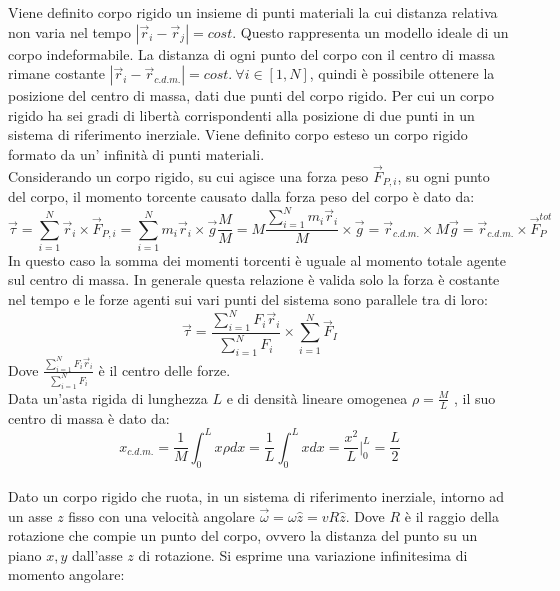 \documentclass{article}
\numberwithin{equation}{subsection}
\begin{document}
Viene definito corpo rigido un insieme di punti materiali la 
cui distanza relativa non varia nel tempo $|\vec{r}_i-\vec{r}_j|=cost.$ Questo rappresenta un modello ideale di un corpo indeformabile. 
La distanza di ogni punto del corpo con il centro di massa 
rimane costante $|\vec{r}_i-\vec{r}_{c.d.m.}|=cost.\:\forall i\in[1,N]$, quindi è possibile ottenere la posizione 
del centro di massa, dati due punti del corpo rigido. Per cui un 
corpo rigido ha sei gradi di libertà corrispondenti alla posizione di due punti in un sistema di riferimento inerziale.  
Viene definito corpo esteso un corpo rigido formato da un'
infinità di punti materiali. 
\\
Considerando un corpo rigido, su cui agisce una forza peso $\vec{F}_{{P,i}}$, 
su ogni punto del corpo, il momento torcente causato dalla forza 
peso del corpo è dato da: 
\begin{equation*}
    \vec{\tau}=\displaystyle\sum_{i=1}^{N}\vec{r}_i\times\vec{F}_{P,i}=
    \displaystyle\sum_{i=1}^{N}m_i\vec{r}_i\times\vec{g}\frac{M}{M}=
    M\displaystyle\frac{\sum_{i=1}^{N}m_i\vec{r}_i}{M}\times\vec{g}=
    \vec{r}_{c.d.m.}\times M\vec{g}=
    \vec{r}_{c.d.m.}\times \vec{F}_P^{tot}
\end{equation*}
In questo caso la somma dei momenti torcenti è uguale al 
momento totale agente sul centro di massa. In generale questa 
relazione è valida solo la forza è costante nel tempo e le 
forze agenti sui vari punti del sistema sono parallele tra di loro: 
\begin{equation}
    \vec{\tau}=\displaystyle\frac{\sum_{i=1}^{N}F_i\vec{r}_i}{\sum_{i=1}^{N}F_i}\times\sum_{i=1}^{N}\vec{F}_I
\end{equation}
Dove $\displaystyle\frac{\sum_{i=1}^{N}F_i\vec{r}_i}{\sum_{i=1}^{N}F_i}$ 
è il centro delle forze.
\\
Data un'asta rigida di lunghezza $L$ e di densità lineare omogenea $\rho=\displaystyle\frac{M}{L}$ , 
il suo centro di massa è dato da:
\begin{equation*}
    x_{c.d.m.}=\displaystyle\frac{1}{M}\int_{0}^{L}x\rho dx=\frac{1}{L}\int_{0}^{L}xdx=\frac{x^2}{L}\Bigg|_0^L=\frac{L}{2} 
\end{equation*}
\\
Dato un corpo rigido che ruota, in un sistema di riferimento inerziale, intorno ad un asse $z$ fisso con una 
velocità angolare $\vec{\omega}=\omega\hat{z}=vR\hat{z}$. Dove 
$R$ è il raggio della rotazione che compie un punto del corpo, ovvero la distanza del punto su un piano $x,y$ 
dall'asse $z$ di rotazione. Si esprime una variazione infinitesima di momento angolare: 
\end{document}
